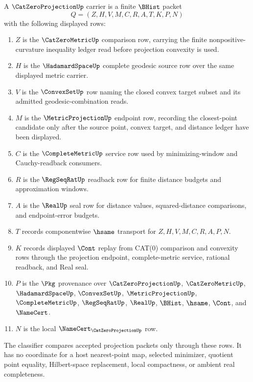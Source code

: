 \begin{definition}
\label{def:cat-zero-projection-carrier}
A $\CatZeroProjectionUp$ carrier is a finite $\BHist$ packet
$$
Q=(Z,H,V,M,C,R,A,T,K,P,N)
$$
with the following displayed rows:
\begin{enumerate}
\item $Z$ is the $\CatZeroMetricUp$ comparison row, carrying the finite nonpositive-curvature inequality ledger read before projection convexity is used.
\item $H$ is the $\HadamardSpaceUp$ complete geodesic source row over the same displayed metric carrier.
\item $V$ is the $\ConvexSetUp$ row naming the closed convex target subset and its admitted geodesic-combination reads.
\item $M$ is the $\MetricProjectionUp$ endpoint row, recording the closest-point candidate only after the source point, convex target, and distance ledger have been displayed.
\item $C$ is the $\CompleteMetricUp$ service row used by minimizing-window and Cauchy-readback consumers.
\item $R$ is the $\RegSeqRatUp$ readback row for finite distance budgets and approximation windows.
\item $A$ is the $\RealUp$ seal row for distance values, squared-distance comparisons, and endpoint-error budgets.
\item $T$ records componentwise $\hsame$ transport for $Z,H,V,M,C,R,A,P,N$.
\item $K$ records displayed $\Cont$ replay from CAT(0) comparison and convexity rows through the projection endpoint, complete-metric service, rational readback, and Real seal.
\item $P$ is the $\Pkg$ provenance over $\CatZeroProjectionUp$, $\CatZeroMetricUp$, $\HadamardSpaceUp$, $\ConvexSetUp$, $\MetricProjectionUp$, $\CompleteMetricUp$, $\RegSeqRatUp$, $\RealUp$, $\BHist$, $\hsame$, $\Cont$, and $\NameCert$.
\item $N$ is the local $\NameCert_{\CatZeroProjectionUp}$ row.
\end{enumerate}
The classifier compares accepted projection packets only through these rows. It has no coordinate for a host nearest-point map, selected minimizer, quotient point equality, Hilbert-space replacement, local compactness, or ambient real completeness.
\end{definition}

